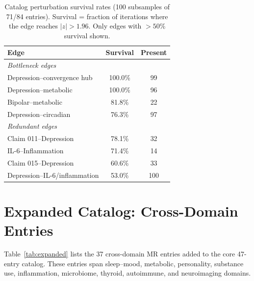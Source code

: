 \documentclass{article}
\begin{document}
\begin{table}[h]
\centering
\caption{Catalog perturbation survival rates (100 subsamples of 71/84 entries). Survival = fraction of iterations where the edge reaches $|z| > 1.96$. Only edges with $> 50\%$ survival shown.}
\label{tab:perturbation}
\small
\begin{tabular}{lcc}
\toprule
Edge & Survival & Present \\
\midrule
\multicolumn{3}{l}{\emph{Bottleneck edges}} \\
Depression--convergence hub & 100.0\% & 99 \\
Depression--metabolic & 100.0\% & 96 \\
Bipolar--metabolic & 81.8\% & 22 \\
Depression--circadian & 76.3\% & 97 \\
\midrule
\multicolumn{3}{l}{\emph{Redundant edges}} \\
Claim 011--Depression & 78.1\% & 32 \\
IL-6--Inflammation & 71.4\% & 14 \\
Claim 015--Depression & 60.6\% & 33 \\
Depression--IL-6/inflammation & 53.0\% & 100 \\
\bottomrule
\end{tabular}
\end{table}

\section{Expanded Catalog: Cross-Domain Entries}
\label{app:expanded}

Table~\ref{tab:expanded} lists the 37 cross-domain MR entries added to the core 47-entry catalog. These entries span sleep--mood, metabolic, personality, substance use, inflammation, microbiome, thyroid, autoimmune, and neuroimaging domains.
\end{document}
